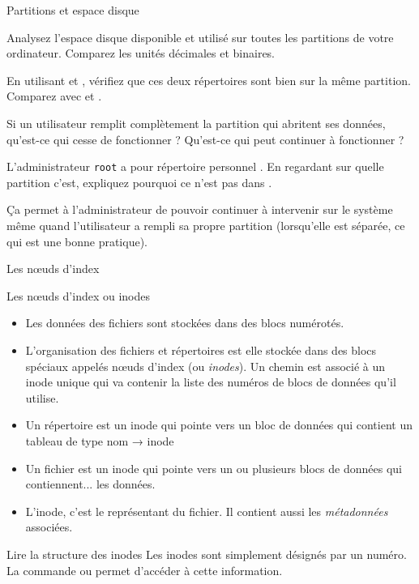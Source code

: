
\begin{exercice}
  \begin{exercicelet}{Partitions et espace disque}
    \begin{questions}
    \item Analysez l'espace disque disponible et utilisé sur toutes les
      partitions de votre ordinateur. Comparez les unités décimales et
      binaires.
    \item En utilisant  et , vérifiez que ces
      deux répertoires sont bien sur la même partition. Comparez avec
       et .
    \item Si un utilisateur remplit complètement la partition qui
      abritent ses données, qu'est-ce qui cesse de fonctionner ?
      Qu'est-ce qui peut continuer à fonctionner ?
    \item L'administrateur \texttt{root} a pour répertoire personnel
      . En regardant sur quelle partition c'est, expliquez
      pourquoi ce n'est pas dans .
      \begin{correction}
        Ça permet à l'administrateur de pouvoir continuer à intervenir
        sur le système même quand l'utilisateur a rempli sa propre
        partition (lorsqu'elle est séparée, ce qui est une bonne
        pratique).
      \end{correction}
    \end{questions}
  \end{exercicelet}
\end{exercice}

\begin{frame}{Les nœuds d'index}
  \begin{block}{Les nœuds d'index ou inodes}
    \begin{itemize}
    \item  Les données des fichiers sont stockées dans des blocs
      numérotés.
    \item[\ddialoginformation] L'organisation des fichiers et répertoires
      est elle stockée dans des blocs spéciaux appelés nœuds d'index (ou
      \emph{inodes}). Un chemin est associé à un inode unique qui va
      contenir la liste des numéros de blocs de données qu'il utilise.
    \item Un répertoire est un inode qui pointe vers un bloc de données
      qui contient un tableau de type nom → inode
    \item Un fichier est un inode qui pointe vers un ou plusieurs blocs
      de données qui contiennent... les données.
    \item[\ddialogwarning] L'inode, c'est le représentant du fichier. Il
      contient aussi les \emph{métadonnées} associées.
    \end{itemize}
  \end{block}
  \begin{block}{Lire la structure des inodes}
    Les inodes sont simplement désignés par un numéro. La commande
     ou  permet d'accéder à cette information.
  \end{block}
\end{frame}

